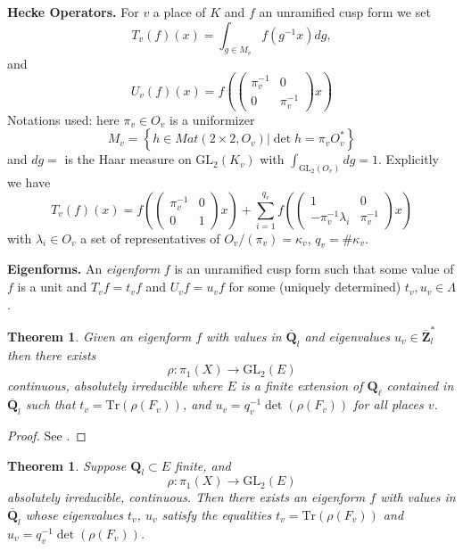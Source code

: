 \documentclass{stacks-project}
\theoremstyle{plain}
\newtheorem{theorem}[subsection]{Theorem}
\theoremstyle{definition}
\theoremstyle{remark}
\numberwithin{equation}{subsection}
\begin{document}
\noindent
{\bf Hecke Operators.}
For $v$ a place of $K$ and $f$ an unramified cusp form we set
$$
T_v(f)(x) =
\int_{g\in M_v}f(g^{-1}x)dg,
$$
and
$$
U_v(f)(x) =
f\left(
\left(
\begin{matrix}
\pi_v^{-1} & 0 \\
0 & \pi_v^{-1}
\end{matrix}
\right)x\right)
$$
Notations used: here $\pi_v \in O_v$ is a uniformizer
$$
M_v =
\left\{
h\in Mat(2\times 2, O_v) | \det h = \pi_vO_v^*\right\}
$$
and $dg = $ is the Haar measure on $\text{GL}_2(K_v)$ with
$\int_{\text{GL}_2(O_v)} dg = 1$. Explicitly we have
$$
T_v(f)(x) =
f\left(
\left(
\begin{matrix}
\pi_v^{-1}& 0 \\
0 & 1
\end{matrix}
\right)
x\right) +
\sum_{i = 1}^{q_v}
f\left(\left(
\begin{matrix}
1 & 0 \\
-\pi_v^{-1}\lambda_i
& \pi_v^{-1}
\end{matrix}
\right) x\right)
$$
with $\lambda_i\in O_v$ a set of representatives of
$O_v/(\pi_v)=\kappa_v$, $q_v = \#\kappa_v$.

\medskip\noindent
{\bf Eigenforms.} An {\it eigenform} $f$ is an unramified cusp form
such that some value of $f$ is a unit and $T_vf = t_vf$ and
$U_vf = u_vf$ for some (uniquely determined) $t_v, u_v \in \Lambda$.

\begin{theorem}
\label{theorem-drinfeld-make-rho}
Given an eigenform $f$ with values in
$\overline{\mathbf{Q}}_l$ and eigenvalues
$u_v\in \overline{\mathbf{Z}}_l^*$ then there exists
$$
\rho : \pi_1(X)\to \text{GL}_2(E)
$$
continuous, absolutely irreducible where
$E$ is a finite extension of $\mathbf{Q}_\ell$ contained in
$\overline{\mathbf{Q}}_l$ such that
$t_v = \text{Tr}(\rho(F_v))$, and
$u_v = q_v^{-1}\det\left(\rho(F_v)\right)$ for all places $v$.
\end{theorem}

\begin{proof}
See \cite{D0}.
\end{proof}

\begin{theorem}
\label{theorem-drinfeld-make-f}
Suppose $\mathbf{Q}_l \subset E$ finite, and
$$
\rho : \pi_1(X)\to \text{GL}_2(E)
$$
absolutely irreducible, continuous. Then there exists an eigenform $f$ with
values in $\overline{\mathbf{Q}}_l$ whose eigenvalues $t_v$, $u_v$
satisfy the equalities
$t_v = \text{Tr}(\rho(F_v))$ and $u_v = q_v^{-1}\det(\rho(F_v))$.
\end{theorem}
\end{document}
